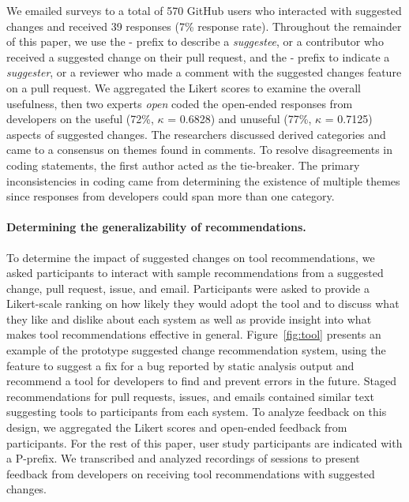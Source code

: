 We emailed surveys to a total of 570 GitHub users who interacted with suggested changes and received 39 responses (7\% response rate).  Throughout the remainder of this paper, we use the \see- prefix to describe a \textit{suggestee}, or a contributor who received a suggested change on their pull request, and the \ser- prefix to indicate a \textit{suggester}, or a reviewer who made a comment with the suggested changes feature on a pull request. We aggregated the Likert scores to examine the overall usefulness, then two experts \textit{open} coded the open-ended responses from developers on the useful (72\%, $\kappa$ = 0.6828) and unuseful (77\%, $\kappa$ = 0.7125) aspects of suggested changes. The researchers discussed derived categories and came to a consensus on themes found in comments. To resolve disagreements in coding statements, the first author acted as the tie-breaker. The primary inconsistencies in coding came from determining the existence of multiple themes since responses from developers could span more than one category.

\paragraph{Determining the generalizability of recommendations.}


To determine the impact of suggested changes on tool recommendations, we asked participants to interact with sample recommendations from a suggested change, pull request, issue, and email. Participants were asked to provide a Likert-scale ranking on how likely they would adopt the tool and to discuss what they like and dislike about each system as well as provide insight into what makes tool recommendations effective in general. Figure~\ref{fig:tool} presents an example of the prototype suggested change recommendation system, using the feature to suggest a fix for a bug reported by static analysis output and recommend a tool for developers to find and prevent errors in the future. Staged recommendations for pull requests, issues, and emails contained similar text suggesting tools to participants from each system. To analyze feedback on this design, we aggregated the Likert scores and open-ended feedback from participants. For the rest of this paper, user study participants are indicated with a P-prefix. We transcribed and analyzed recordings of sessions to present feedback from developers on receiving tool recommendations with suggested changes.

